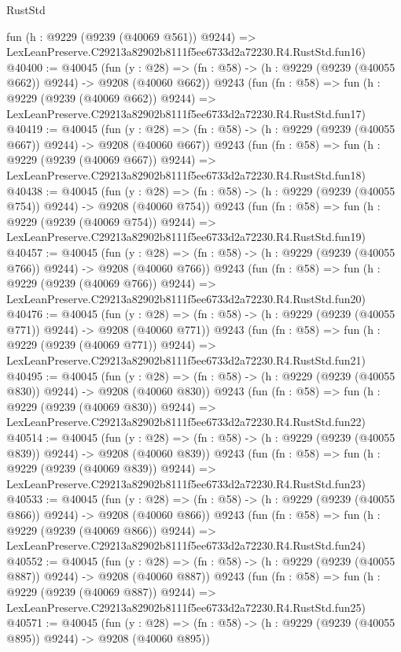 \begin{lexlean}{RustStd}
\begin{coremodule}
    fun (h : @9229 (@9239 (@40069 @561)) @9244) =>
    LexLeanPreserve.C29213a82902b8111f5ee6733d2a72230.R4.RustStd.fun16)
@40400 := @40045
    (fun (y : @28) => (fn : @58) -> (h : @9229 (@9239 (@40055 @662)) @9244) -> @9208 (@40060 @662))
    @9243
    (fun (fn : @58) =>
    fun (h : @9229 (@9239 (@40069 @662)) @9244) =>
    LexLeanPreserve.C29213a82902b8111f5ee6733d2a72230.R4.RustStd.fun17)
@40419 := @40045
    (fun (y : @28) => (fn : @58) -> (h : @9229 (@9239 (@40055 @667)) @9244) -> @9208 (@40060 @667))
    @9243
    (fun (fn : @58) =>
    fun (h : @9229 (@9239 (@40069 @667)) @9244) =>
    LexLeanPreserve.C29213a82902b8111f5ee6733d2a72230.R4.RustStd.fun18)
@40438 := @40045
    (fun (y : @28) => (fn : @58) -> (h : @9229 (@9239 (@40055 @754)) @9244) -> @9208 (@40060 @754))
    @9243
    (fun (fn : @58) =>
    fun (h : @9229 (@9239 (@40069 @754)) @9244) =>
    LexLeanPreserve.C29213a82902b8111f5ee6733d2a72230.R4.RustStd.fun19)
@40457 := @40045
    (fun (y : @28) => (fn : @58) -> (h : @9229 (@9239 (@40055 @766)) @9244) -> @9208 (@40060 @766))
    @9243
    (fun (fn : @58) =>
    fun (h : @9229 (@9239 (@40069 @766)) @9244) =>
    LexLeanPreserve.C29213a82902b8111f5ee6733d2a72230.R4.RustStd.fun20)
@40476 := @40045
    (fun (y : @28) => (fn : @58) -> (h : @9229 (@9239 (@40055 @771)) @9244) -> @9208 (@40060 @771))
    @9243
    (fun (fn : @58) =>
    fun (h : @9229 (@9239 (@40069 @771)) @9244) =>
    LexLeanPreserve.C29213a82902b8111f5ee6733d2a72230.R4.RustStd.fun21)
@40495 := @40045
    (fun (y : @28) => (fn : @58) -> (h : @9229 (@9239 (@40055 @830)) @9244) -> @9208 (@40060 @830))
    @9243
    (fun (fn : @58) =>
    fun (h : @9229 (@9239 (@40069 @830)) @9244) =>
    LexLeanPreserve.C29213a82902b8111f5ee6733d2a72230.R4.RustStd.fun22)
@40514 := @40045
    (fun (y : @28) => (fn : @58) -> (h : @9229 (@9239 (@40055 @839)) @9244) -> @9208 (@40060 @839))
    @9243
    (fun (fn : @58) =>
    fun (h : @9229 (@9239 (@40069 @839)) @9244) =>
    LexLeanPreserve.C29213a82902b8111f5ee6733d2a72230.R4.RustStd.fun23)
@40533 := @40045
    (fun (y : @28) => (fn : @58) -> (h : @9229 (@9239 (@40055 @866)) @9244) -> @9208 (@40060 @866))
    @9243
    (fun (fn : @58) =>
    fun (h : @9229 (@9239 (@40069 @866)) @9244) =>
    LexLeanPreserve.C29213a82902b8111f5ee6733d2a72230.R4.RustStd.fun24)
@40552 := @40045
    (fun (y : @28) => (fn : @58) -> (h : @9229 (@9239 (@40055 @887)) @9244) -> @9208 (@40060 @887))
    @9243
    (fun (fn : @58) =>
    fun (h : @9229 (@9239 (@40069 @887)) @9244) =>
    LexLeanPreserve.C29213a82902b8111f5ee6733d2a72230.R4.RustStd.fun25)
@40571 := @40045
    (fun (y : @28) => (fn : @58) -> (h : @9229 (@9239 (@40055 @895)) @9244) -> @9208 (@40060 @895))

\end{coremodule}
\end{lexlean}
